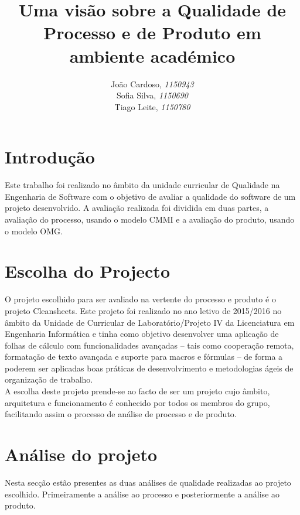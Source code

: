 \documentclass[openany,10pt,a4paper]{article}
\begin{document}

\title{\textbf{Uma visão sobre a Qualidade de Processo e de Produto em ambiente académico}}
\author{João Cardoso, \textit{1150943} \\ Sofia Silva, \textit{1150690} \\ Tiago Leite, \textit{1150780}}
\date{}

\maketitle

\section{Introdução}
Este trabalho foi realizado no âmbito da unidade curricular de Qualidade na Engenharia de Software com o objetivo de avaliar a qualidade do software de um projeto desenvolvido. A avaliação realizada foi dividida em duas partes, a avaliação do processo, usando o modelo CMMI e a avaliação do produto, usando o modelo OMG.

\section{Escolha do Projecto}
O projeto escolhido para ser avaliado na vertente do processo e produto é o projeto Cleansheets. Este projeto foi realizado no ano letivo de 2015/2016 no âmbito da Unidade de Curricular de Laboratório/Projeto IV da Licenciatura em Engenharia Informática e tinha como objetivo desenvolver uma aplicação de folhas de cálculo com funcionalidades avançadas – tais como cooperação remota, formatação de texto avançada e suporte para macros e fórmulas – de forma a poderem ser aplicadas boas práticas de desenvolvimento e metodologias ágeis de organização de trabalho.\\
A escolha deste projeto prende-se ao facto de ser um projeto cujo âmbito, arquitetura e funcionamento é conhecido por todos os membros do grupo, facilitando assim o processo de análise de processo e de produto. 

\section{Análise do projeto}
Nesta secção estão presentes as duas análises de qualidade realizadas ao projeto escolhido. Primeiramente a análise ao processo e posteriormente a análise ao produto.
\end{document}
